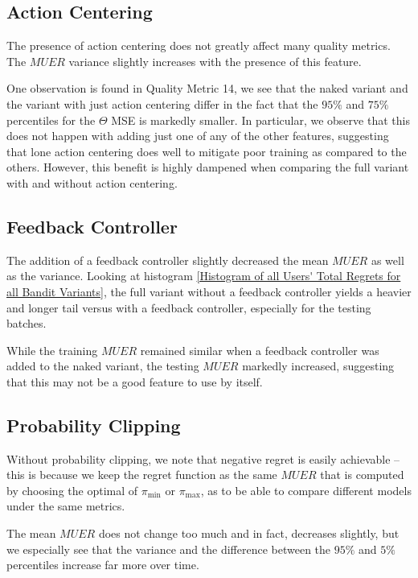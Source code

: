 \clearpage

\subsection{Action Centering}

The presence of action centering does not greatly affect many quality metrics.  The $MUER$ variance slightly increases with the presence of this feature.

One observation is found in Quality Metric 14, we see that the naked variant and the variant with just action centering differ in the fact that the $95\%$ and $75\%$ percentiles for the $\Theta$ MSE is markedly smaller.  In particular, we observe that this does not happen with adding just one of any of the other features, suggesting that lone action centering does well to mitigate poor training as compared to the others.  However, this benefit is highly dampened when comparing the full variant with and without action centering.


\subsection{Feedback Controller}

The addition of a feedback controller slightly decreased the mean $MUER$ as well as the variance.  Looking at histogram \ref{Histogram of all Users' Total Regrets for all Bandit Variants}, the full variant without a feedback controller yields a heavier and longer tail versus with a feedback controller, especially for the testing batches.

While the training $MUER$ remained similar when a feedback controller was added to the naked variant, the testing $MUER$ markedly increased, suggesting that this may not be a good feature to use by itself.

\subsection{Probability Clipping}

Without probability clipping, we note that negative regret is easily achievable -- this is because we keep the regret function as the same $MUER$ that is computed by choosing the optimal of $\pi_\text{min}$ or $\pi_\text{max}$, as to be able to compare different models under the same metrics.

The mean $MUER$ does not change too much and in fact, decreases slightly, but we especially see that the variance and the difference between the $95\%$ and $5\%$ percentiles increase far more over time. 

